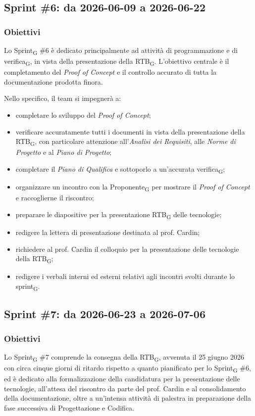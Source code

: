 ﻿\documentclass[a4paper, 10pt, colorlinks=true, linkcolor=black, urlcolor=blue, citecolor=blue, hidelinks]{article}
\begin{document}
\subsection{Sprint \#6: da 2026-06-09 a 2026-06-22}

\subsubsection{Obiettivi}
Lo Sprint\textsubscript{G} \#6 è dedicato principalmente ad attività di programmazione e di verifica\textsubscript{G}, in vista della presentazione della RTB\textsubscript{G}. L'obiettivo centrale è il completamento del \textit{Proof of Concept} e il controllo accurato di tutta la documentazione prodotta finora.

Nello specifico, il team si impegnerà a:
\begin{itemize}
    \item completare lo sviluppo del \textit{Proof of Concept};
    \item verificare accuratamente tutti i documenti in vista della presentazione della RTB\textsubscript{G}, con particolare attenzione all'\textit{Analisi dei Requisiti}, alle \textit{Norme di Progetto} e al \textit{Piano di Progetto};
    \item completare il \textit{Piano di Qualifica} e sottoporlo a un'accurata verifica\textsubscript{G};
    \item organizzare un incontro con la Proponente\textsubscript{G} per mostrare il \textit{Proof of Concept} e raccoglierne il riscontro;
    \item preparare le diapositive per la presentazione RTB\textsubscript{G} delle tecnologie;
    \item redigere la lettera di presentazione destinata al prof. Cardin;
    \item richiedere al prof. Cardin il colloquio per la presentazione delle tecnologie della RTB\textsubscript{G};
    \item redigere i verbali interni ed esterni relativi agli incontri svolti durante lo sprint\textsubscript{G}.
\end{itemize}


\subsection{Sprint \#7: da 2026-06-23 a 2026-07-06}

\subsubsection{Obiettivi}
Lo Sprint\textsubscript{G} \#7 comprende la consegna della RTB\textsubscript{G}, avvenuta il 25 giugno 2026 con circa cinque giorni di ritardo rispetto a quanto pianificato per lo Sprint\textsubscript{G} \#6, ed è dedicato alla formalizzazione della candidatura per la presentazione delle tecnologie, all'attesa del riscontro da parte del prof. Cardin e al consolidamento della documentazione, oltre a un'intensa attività di palestra in preparazione della fase successiva di Progettazione e Codifica.
\end{document}
